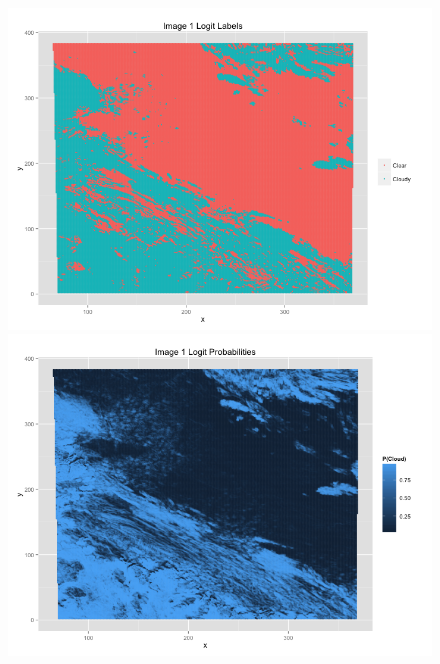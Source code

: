 \documentclass{article}\usepackage[]{graphicx}\usepackage[]{color}
\begin{document}
\begin{figure}
\includegraphics[scale = .35]{Image1FullLogit.png}
\includegraphics[scale = .35]{Image1FullLogitProb.png}


\end{figure}
\end{document}
